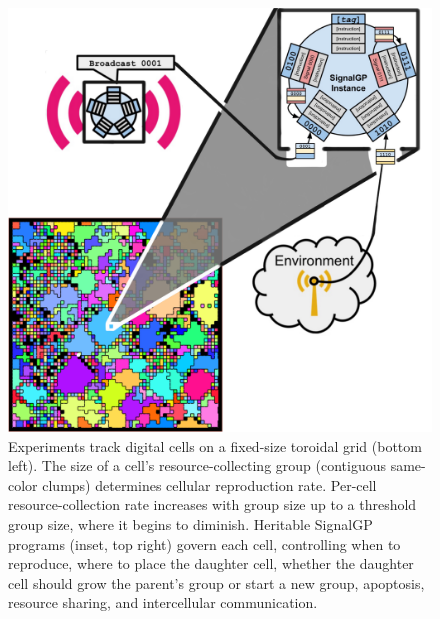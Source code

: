 \begin{figure}
  \centering
  \includegraphics[width=\textwidth]{img/schematic}
  \vspace{-10ex}
  \begin{columns}
  \begin{column}{0.52\textwidth}
  \end{column}
  \begin{column}{0.48\textwidth}
  \caption{
  Experiments track digital cells on a fixed-size toroidal grid (bottom left).
  The size of a cell's resource-collecting group (contiguous same-color clumps) determines cellular reproduction rate.
  Per-cell resource-collection rate increases with group size up to a threshold group size, where it begins to diminish.
  Heritable SignalGP programs (inset, top right) \cite{Lalejini2018-GECCO} govern each cell, controlling when to reproduce, where to place the daughter cell, whether the daughter cell should grow the parent's group or start a new group, apoptosis, resource sharing, and intercellular communication.
  }
  \label{fig:model}
  \end{column}
  \end{columns}
\end{figure}
